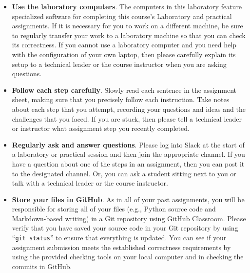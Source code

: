 \documentclass[11pt]{article}
\newcommand{\command}[1]{``\lstinline{#1}''}
\begin{document}
\begin{itemize}
  \setlength{\itemsep}{0pt}

\item {\bf Use the laboratory computers}. The computers in this laboratory
  feature specialized software for completing this course's Laboratory and
  practical assignments. If it is necessary for you to work on a different
  machine, be sure to regularly transfer your work to a laboratory machine so
  that you can check its correctness. If you cannot use a laboratory computer
  and you need help with the configuration of your own laptop, then please
  carefully explain its setup to a technical leader or the course instructor
  when you are asking questions.

\item {\bf Follow each step carefully}. Slowly read each sentence in the
  assignment sheet, making sure that you precisely follow each instruction.
  Take notes about each step that you attempt, recording your questions and
  ideas and the challenges that you faced. If you are stuck, then please tell a
  technical leader or instructor what assignment step you recently completed.

\item {\bf Regularly ask and answer questions}. Please log into Slack at the
  start of a laboratory or practical session and then join the appropriate
  channel. If you have a question about one of the steps in an assignment, then
  you can post it to the designated channel. Or, you can ask a student sitting
  next to you or talk with a technical leader or the course instructor.

\item {\bf Store your files in GitHub}. As in all of your past assignments, you
  will be responsible for storing all of your files (e.g., Python source code and
  Markdown-based writing) in a Git repository using GitHub Classroom. Please
  verify that you have saved your source code in your Git repository by using
  \command{git status} to ensure that everything is updated. You can see if
  your assignment submission meets the established correctness requirements by
  using the provided checking tools on your local computer and in checking the
  commits in GitHub.



\end{itemize}
\end{document}
